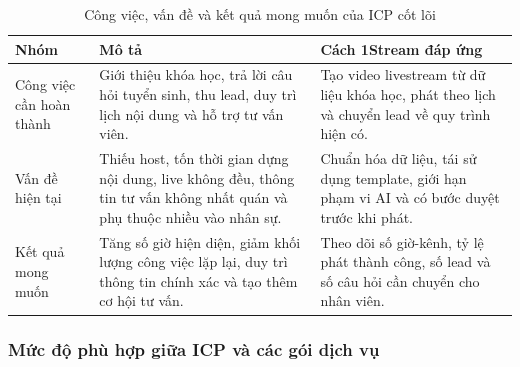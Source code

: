 \begin{table}[H]
    \centering
    \small
    \setlength{\tabcolsep}{4pt}
    \renewcommand{\arraystretch}{1.25}
    \caption{Công việc, vấn đề và kết quả mong muốn của ICP cốt lõi}
    \label{tab:jobs-pains-gains-1stream}
    \begin{tabularx}{\linewidth}{@{}L{2.5cm}Y Y@{}}
        \toprule
        \textbf{Nhóm} & \textbf{Mô tả} & \textbf{Cách 1Stream đáp ứng} \\ \midrule
        Công việc cần hoàn thành & Giới thiệu khóa học, trả lời câu hỏi tuyển sinh,
        thu lead, duy trì lịch nội dung và hỗ trợ tư vấn viên. &
        Tạo video livestream từ dữ liệu khóa học, phát theo lịch và chuyển lead
        về quy trình hiện có. \\
        Vấn đề hiện tại & Thiếu host, tốn thời gian dựng nội dung, live không đều,
        thông tin tư vấn không nhất quán và phụ thuộc nhiều vào nhân sự. &
        Chuẩn hóa dữ liệu, tái sử dụng template, giới hạn phạm vi AI và có bước
        duyệt trước khi phát. \\
        Kết quả mong muốn & Tăng số giờ hiện diện, giảm khối lượng công việc lặp
        lại, duy trì thông tin chính xác và tạo thêm cơ hội tư vấn. &
        Theo dõi số giờ-kênh, tỷ lệ phát thành công, số lead và số câu hỏi cần
        chuyển cho nhân viên. \\ \bottomrule
    \end{tabularx}
\end{table}

\subsubsection{Mức độ phù hợp giữa ICP và các gói dịch vụ}

